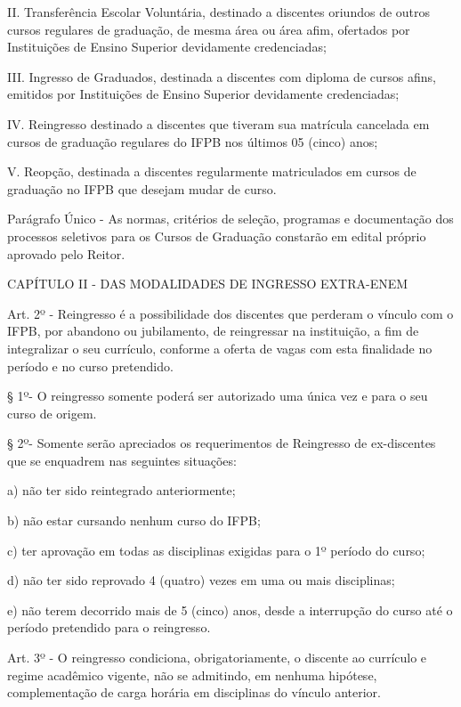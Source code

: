 II. Transferência Escolar Voluntária, destinado a discentes oriundos de outros cursos regulares de graduação, de mesma área ou área afim, ofertados por Instituições de Ensino Superior devidamente credenciadas;

III. Ingresso de Graduados, destinada a discentes com diploma de cursos afins, emitidos por Instituições de Ensino Superior devidamente credenciadas;

IV. Reingresso destinado a discentes que tiveram sua matrícula cancelada em cursos de graduação regulares do IFPB nos últimos 05 (cinco) anos;

V. Reopção, destinada a discentes regularmente matriculados em cursos de graduação no IFPB que desejam mudar de curso.


Parágrafo Único - As normas, critérios de seleção, programas e documentação dos processos seletivos para os Cursos de Graduação constarão em edital próprio aprovado pelo Reitor.

CAPÍTULO II - DAS MODALIDADES DE INGRESSO EXTRA-ENEM

\vspace{1mm}
Art. 2º - Reingresso é a possibilidade dos discentes que perderam o vínculo com o IFPB, por abandono ou jubilamento, de reingressar na instituição, a fim de integralizar o seu currículo, conforme a oferta de vagas com esta finalidade no período e no curso pretendido.

	§ 1º- O reingresso somente poderá ser autorizado uma única vez e para o seu curso de origem.

	§ 2º- Somente serão apreciados os requerimentos de Reingresso de ex-discentes que se enquadrem nas seguintes situações:

 a)	não ter sido reintegrado anteriormente;

 b)	não estar cursando nenhum curso do IFPB;

 c)	ter aprovação em todas as disciplinas exigidas para o 1º período do curso;

 d)	não ter sido reprovado 4 (quatro) vezes em uma ou mais disciplinas;

 e)	não terem decorrido mais de 5 (cinco) anos, desde a interrupção do curso até o período pretendido para o reingresso.

\vspace{1mm}
Art. 3º - O reingresso condiciona, obrigatoriamente, o discente ao currículo e regime acadêmico vigente, não se admitindo, em nenhuma hipótese, complementação de carga horária em disciplinas do vínculo anterior.

